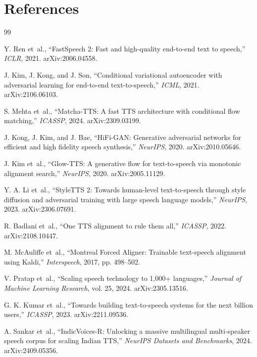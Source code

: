 \documentclass[12pt,a4paper]{article}
\begin{document}
\section*{References}
\begingroup
\footnotesize
{}
\begin{thebibliography}{99}
\setlength{\itemsep}{0pt}\setlength{\parsep}{0pt}

Y. Ren et~al., ``FastSpeech 2: Fast and high-quality end-to-end text to
speech,'' \textit{ICLR}, 2021. arXiv:2006.04558.

J. Kim, J. Kong, and J. Son, ``Conditional variational autoencoder with
adversarial learning for end-to-end text-to-speech,'' \textit{ICML}, 2021.
arXiv:2106.06103.

S. Mehta et~al., ``Matcha-TTS: A fast
TTS architecture with conditional flow matching,'' \textit{ICASSP}, 2024.
arXiv:2309.03199.

J. Kong, J. Kim, and J. Bae, ``HiFi-GAN: Generative adversarial networks for
efficient and high fidelity speech synthesis,'' \textit{NeurIPS}, 2020.
arXiv:2010.05646.

J. Kim et~al., ``Glow-TTS: A generative flow for
text-to-speech via monotonic alignment search,'' \textit{NeurIPS}, 2020.
arXiv:2005.11129.

Y. A. Li et~al., ``StyleTTS 2:
Towards human-level text-to-speech through style diffusion and adversarial
training with large speech language models,'' \textit{NeurIPS}, 2023.
arXiv:2306.07691.

R. Badlani et~al.,
``One TTS alignment to rule them all,'' \textit{ICASSP}, 2022.
arXiv:2108.10447.

M. McAuliffe et~al., ``Montreal
Forced Aligner: Trainable text-speech alignment using Kaldi,''
\textit{Interspeech}, 2017, pp. 498--502.

V. Pratap et~al., ``Scaling speech technology to 1,000+ languages,''
\textit{Journal of Machine Learning Research}, vol. 25, 2024. arXiv:2305.13516.

G. K. Kumar et~al., ``Towards
building text-to-speech systems for the next billion users,'' \textit{ICASSP},
2023. arXiv:2211.09536.

A. Sankar et~al., ``IndicVoices-R: Unlocking a massive multilingual
multi-speaker speech corpus for scaling Indian TTS,'' \textit{NeurIPS Datasets
and Benchmarks}, 2024. arXiv:2409.05356.


\end{thebibliography}
\end{document}
